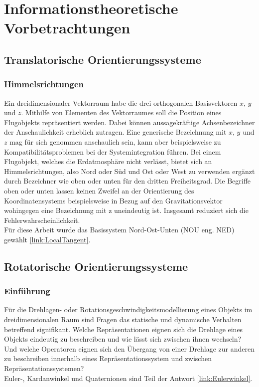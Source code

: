 \section{Informationstheoretische Vorbetrachtungen}
\subsection{Translatorische Orientierungssysteme}
\subsubsection{Himmelsrichtungen}
Ein dreidimensionaler Vektorraum habe die drei orthogonalen Basisvektoren $x$, $y$ und $z$. Mithilfe von Elementen des Vektorraumes soll die Position eines Flugobjekts repräsentiert werden.
Dabei können aussagekräftige Achsenbezeichner der Anschaulichkeit erheblich zutragen. Eine generische Bezeichnung mit $x$, $y$ und $z$ mag für sich genommen anschaulich sein, kann aber beispielsweise zu Kompatibilitätsproblemen bei der Systemintegration führen. Bei einem Flugobjekt, welches die Erdatmosphäre nicht verlässt, bietet sich an Himmelsrichtungen, also Nord oder Süd und Ost oder West zu verwenden ergänzt durch Bezeichner wie oben oder unten für den dritten Freiheitsgrad. Die Begriffe oben oder unten lassen keinen Zweifel an der Orientierung des Koordinatensystems beispielsweise in Bezug auf den Gravitationsvektor wohingegen eine Bezeichnung mit z uneindeutig ist. Insgesamt reduziert sich die Fehlerwahrscheinlichkeit.\\
Für diese Arbeit wurde das Basissystem Nord-Ost-Unten (NOU eng. NED) gewählt \ref{link:LocalTangent}.



\subsection{Rotatorische Orientierungssysteme}

\subsubsection{Einführung}
Für die Drehlagen- oder Rotationsgeschwindigkeitsmodellierung eines Objekts im dreidimensionalen Raum sind Fragen das statische und dynamische Verhalten betreffend signifikant.
Welche Repräsentationen eignen sich die Drehlage eines Objekts eindeutig zu beschreiben und wie lässt sich zwischen ihnen wechseln? Und welche Operatoren eignen sich den Übergang von einer Drehlage zur anderen zu beschreiben innerhalb eines Repräsentationssystem und zwischen Repräsentationssystemen?\\
Euler-, Kardanwinkel und Quaternionen sind Teil der Antwort \ref{link:Eulerwinkel}.

